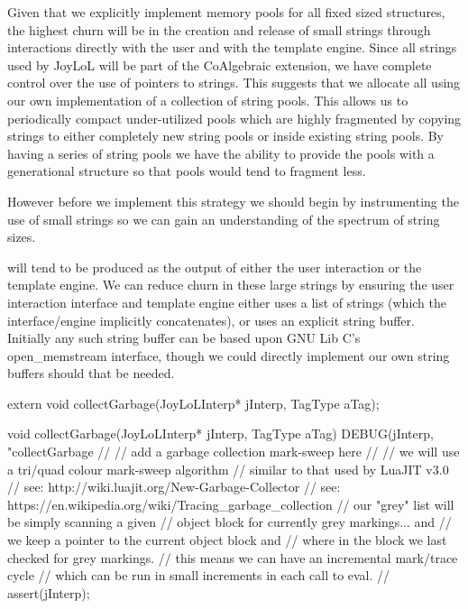 Given that we explicitly implement memory pools for all fixed sized 
structures, the highest churn will be in the creation and release of small 
strings through interactions directly with the user and with the template 
engine. Since all strings used by JoyLoL will be part of the 
 CoAlgebraic extension, we have complete control over the 
use of pointers to strings. This suggests that we allocate all 
 using our own implementation of a collection of 
string pools. This allows us to periodically compact under-utilized pools 
which are highly fragmented by copying strings to either completely new 
string pools or inside existing string pools. By having a series of string 
pools we have the ability to provide the pools with a generational 
structure so that  pools would tend to fragment less. 

However before we implement this strategy we should begin by instrumenting 
the use of small strings so we can gain an understanding of the spectrum of 
string sizes. 

 will tend to be produced as the output of either the 
user interaction or the template engine. We can reduce churn in these 
large strings by ensuring the user interaction interface and template 
engine either uses a list of strings (which the interface/engine 
implicitly concatenates), or uses an explicit string buffer. Initially any 
such string buffer can be based upon GNU Lib C's open_memstream interface, 
though we could directly implement our own string buffers should that be 
needed. 

\startCHeader
extern void collectGarbage(JoyLoLInterp* jInterp, TagType aTag);
\stopCHeader
{}

\startCCode
void collectGarbage(JoyLoLInterp* jInterp, TagType aTag) {
  DEBUG(jInterp, "collectGarbage %
  //
  // add a garbage collection mark-sweep here
  //
  // we will use a tri/quad colour mark-sweep algorithm
  // similar to that used by LuaJIT v3.0
  // see: http://wiki.luajit.org/New-Garbage-Collector
  // see: https://en.wikipedia.org/wiki/Tracing_garbage_collection
  // our "grey" list will be simply scanning a given 
  // object block for currently grey markings... and
  // we keep a pointer to the current object block and
  // where in the block we last checked for grey markings.
  // this means we can have an incremental mark/trace cycle
  // which can be run in small increments in each call to eval.
  //
  assert(jInterp);
}
\stopCCode

